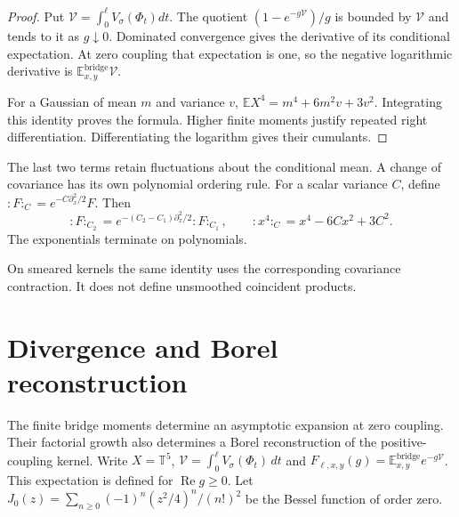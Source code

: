 \begin{proof}
Put $\mathcal V=\int_0^\ell V_\sigma(\Phi_t)dt$.
The quotient $(1-e^{-g\mathcal V})/g$ is bounded by
$\mathcal V$ and tends to it as $g\downarrow0$.
Dominated convergence gives the derivative of its conditional
expectation. At zero coupling that expectation is one, so
the negative logarithmic derivative is
$\mathbb E_{x,y}^{\mathrm{bridge}}\mathcal V$.

For a Gaussian of mean $m$ and variance $v$,
$\mathbb E X^4=m^4+6m^2v+3v^2$.
Integrating this identity proves the formula.
Higher finite moments justify repeated right differentiation.
Differentiating the logarithm gives their cumulants.
\end{proof}

The last two terms retain fluctuations about the conditional
mean. A change of covariance has its own polynomial ordering
rule. For a scalar variance $C$, define
$:F:_C=e^{-C\partial_x^2/2}F$. Then
\begin{equation}\label{mht:eq:scalar-wick-ordering}
 :F:_{C_2}=e^{-(C_2-C_1)\partial_x^2/2}:F:_{C_1},
 \qquad :x^4:_C=x^4-6Cx^2+3C^2.
\end{equation}
The exponentials terminate on polynomials.

On smeared kernels the same identity uses the corresponding
covariance contraction. It does not define unsmoothed
coincident products.

\section{Divergence and Borel reconstruction}

The finite bridge moments determine an asymptotic expansion at
zero coupling. Their factorial growth also determines a Borel
reconstruction of the positive-coupling kernel. Write
$X=\mathbb T^5$, $\mathcal V=\int_0^\ell V_\sigma(\Phi_t)\,dt$ and
$F_{\ell,x,y}(g)=\mathbb E_{x,y}^{\mathrm{bridge}}e^{-g\mathcal V}$.
This expectation is defined for $\operatorname{Re}g\geq0$.
Let $J_0(z)=\sum_{n\geq0}(-1)^n(z^2/4)^n/(n!)^2$ be the
Bessel function of order zero.

